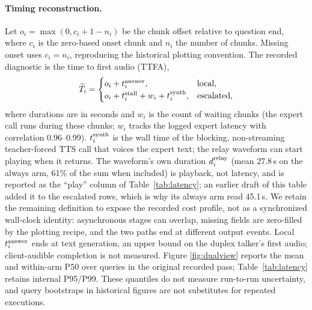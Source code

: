 \paragraph{Timing reconstruction.}
Let $o_i=\max(0,c_i+1-n_i)$ be the chunk offset relative to question
end, where $c_i$ is the zero-based onset chunk and $n_i$ the number
of chunks. Missing onset uses $c_i=n_i$, reproducing the historical
plotting convention. The recorded diagnostic is the time to first audio (TTFA),
\[
 \widetilde T_i=
 \begin{cases}
 o_i+t_i^{\rm answer}, & \text{local},\\
 o_i+t_i^{\rm stall}+w_i+t_i^{\rm synth}, & \text{escalated},
 \end{cases}
\]
where durations are in seconds and $w_i$ is the count of waiting
chunks (the expert call runs during these chunks; $w_i$ tracks the
logged expert latency with correlation 0.96--0.99). $t_i^{\rm synth}$
is the wall time of the blocking, non-streaming teacher-forced TTS
call that voices the expert text; the relay waveform can start
playing when it returns. The waveform's own duration $d_i^{\rm relay}$
(mean 27.8\,s on the always arm, 61\% of the sum when included) is
playback, not latency, and is reported as the ``play'' column of
Table~\ref{tab:latency}; an earlier draft of this table added it to
the escalated rows, which is why its always arm read 45.1\,s. We
retain the remaining definition to expose the recorded cost profile,
not as a synchronized wall-clock identity: asynchronous stages can
overlap, missing fields are zero-filled by the plotting recipe, and
the two paths end at different output events. Local $t_i^{\rm answer}$
ends at text generation, an upper bound on the duplex talker's first
audio; client-audible completion is not measured. Figure
\ref{fig:dualview} reports the mean and within-arm P50 over
queries in the original recorded pass; Table~\ref{tab:latency}
retains internal P95/P99. These quantiles do not
measure run-to-run uncertainty, and query bootstraps in historical
figures are not substitutes for repeated executions.

